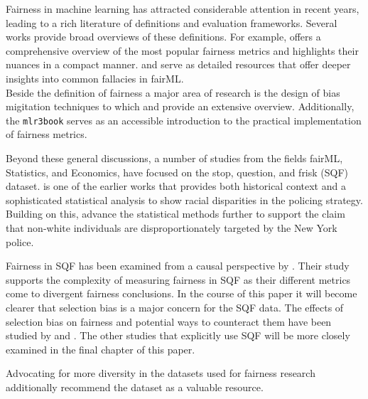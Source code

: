 Fairness in machine learning has attracted considerable attention in recent years, leading to a rich literature of definitions and evaluation frameworks. Several works provide broad overviews of these definitions. For example, \cite{verma2018} offers a comprehensive overview of the most popular fairness metrics and \cite{castelnovo2022} highlights their nuances in a compact manner. \cite{corbett-davies} and \cite{barocas} serve as detailed resources that offer deeper insights into common fallacies in fairML. \\

Beside the definition of fairness a major area of research is the design of bias migitation techniques to which \cite{mehrabi2022} and \cite{caton2024} provide an extensive overview. Additionally, the \texttt{mlr3book} serves as an accessible introduction to the practical implementation of fairness metrics.

Beyond these general discussions, a number of studies from the fields fairML, Statistics, and Economics, have focused on the stop, question, and frisk (SQF) dataset. \cite{gelman2007} is one of the earlier works that provides both historical context and a sophisticated statistical analysis to show racial disparities in the policing strategy. Building on this, \cite{goel2016} advance the statistical methods further to support the claim that non-white individuals are disproportionately targeted by the New York police.

Fairness in SQF has been examined from a causal perspective by \cite{Khademi2019FADMELC}. Their study supports the complexity of measuring fairness in SQF as their different metrics come to divergent fairness conclusions. In the course of this paper it will become clearer that selection bias is a major concern for the SQF data. The effects of selection bias on fairness and potential ways to counteract them have been studied by \cite{Lakkaraju2017SLPEAPPU} and \cite{favier2023}.
The other studies that explicitly use SQF \cite{Badr2022DTFANSP, RambachanBBOEFW, kallus2018} will be more closely examined in the final chapter of this paper.

Advocating for more diversity in the datasets used for fairness research additionally \cite{Fabris_2022} recommend the dataset as a valuable resource.

